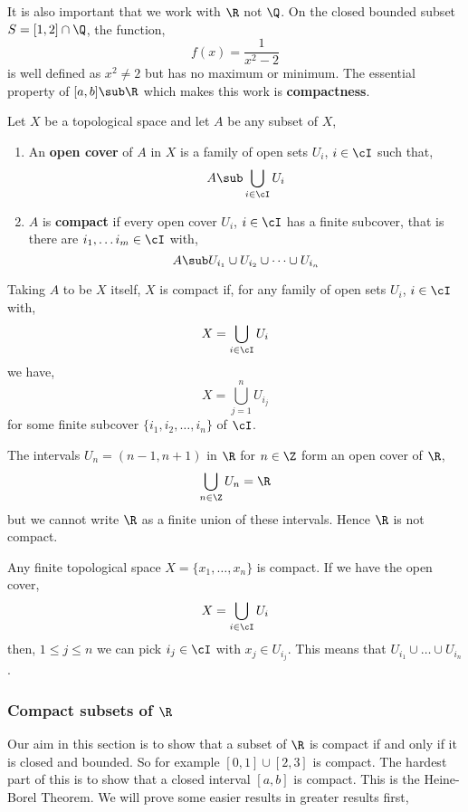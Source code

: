 \noindent
It is also important that we work with $\R$ not $\Q$. On the closed bounded subset $S = [1, 2] \cap \Q$, the function,
$$ f(x) = \frac{1}{x^2 - 2} $$
is well defined as $x^2 \ne 2$ but has no maximum or minimum. The essential property of $[a, b] \sub \R$ which makes this work is \textbf{compactness}.

\begin{ndefi}
  Let $X$ be a topological space and let $A$ be any subset of $X$,
  \begin{enumerate}
    \item An \textbf{open cover} of $A$ in $X$ is a family of open sets $U_i$, $i \in \cI$ such that,
    $$ A \sub \bigcup_{i \in \cI} U_i $$
    \item $A$ is \textbf{compact} if every open cover $U_i$, $i \in \cI$ has a finite subcover, that is there are $i_1, \dots i_m \in \cI$ with,
    $$ A \sub U_{i_1} \cup U_{i_2} \cup \dots \cup U_{i_n} $$
  \end{enumerate}
\end{ndefi}

\begin{remark}
  Taking $A$ to be $X$ itself, $X$ is compact if, for any family of open sets $U_i$, $i \in \cI$ with,
  $$ X = \bigcup_{i \in \cI} U_i $$
  we have,
  $$ X = \bigcup_{j=1}^n U_{i_j}  $$
  for some finite subcover $\{i_1, i_2, \dots, i_n\}$ of $\cI$.
\end{remark}

\begin{eg}
  The intervals $U_n = (n - 1, n + 1)$ in $\R$ for $n \in \Z$ form an open cover of $\R$,
  $$ \bigcup_{n \in \Z} U_n = \R $$
  but we cannot write $\R$ as a finite union of these intervals. Hence $\R$ is not compact.
\end{eg}

\begin{eg}
  Any finite topological space $X = \{x_1, \dots, x_n\}$ is compact. If we have the open cover,
  $$ X = \bigcup_{i \in \cI} U_i $$
  then, $1 \le j \le n$ we can pick $i_j \in \cI$ with $x_j \in U_{i_j}$. This means that $U_{i_1}\cup \dots \cup U_{i_n}$.
\end{eg}

\subsubsection{Compact subsets of $\R$}
Our aim in this section is to show that a subset of $\R$ is compact if and only if it is closed and bounded. So for example $[0, 1] \cup [2, 3]$ is compact. The hardest part of this is to show that a closed interval $[a, b]$ is compact. This is the Heine-Borel Theorem. We will prove some easier results in greater results first,

